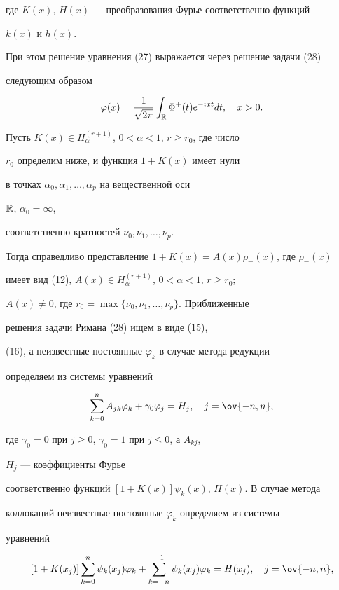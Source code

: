 где $K(x)$, $H(x)$ --- преобразования Фурье соответственно функций 


$k(x)$ и $h(x)$. 


При этом решение уравнения (27) выражается через решение задачи (28) 


следующим образом 


$$ 


\varphi(x)=\frac{1}{\sqrt{2\pi}}\int_{\Bbb R} 


\Phi^+(t)e^{-ixt}dt,\quad x>0. 


$$ 


 


Пусть $K(x)\in H^{(r+1)}_\alpha$, $0<\alpha<1$, $r\ge r_0$, где число 


$r_0$ определим ниже, и функция $1+K(x)$ имеет нули 


в точках $\alpha_0,\alpha_1,\dotsc,\alpha_p$ на вещественной оси 


$\Bbb R$, $\alpha_0=\infty$, 


соответственно кратностей $\nu_0,\nu_1,\dotsc,\nu_p$. 


Тогда справедливо представление $1+K(x)=A(x)\rho_-(x)$, где $\rho_-(x)$ 


имеет вид (12), $A(x)\in H^{(r+1)}_\alpha$, $0<\alpha<1$, $r\ge r_0$; 


$A(x)\ne 0$, где $r_0=\max\{\nu_0,\nu_1,\dotsc,\nu_p\}$. Приближенные 


решения задачи Римана (28) ищем в виде (15), 


(16), а неизвестные постоянные $\varphi_k$ в случае метода редукции 


определяем из системы уравнений 


\begin{equation} 


\sum^n_{k=0}A_{jk}\varphi_k+\gamma_0\varphi_j=H_j,\quad 


j=\ov{-n,n}, 


\end{equation} 


где $\gamma_0=0$ при $j\ge 0$, $\gamma_0=1$ при $j\le 0$, а $A_{kj}$, 


$H_j$ --- коэффициенты Фурье 


соответственно функций $[1+K(x)]\psi_k(x)$, $H(x)$. В случае метода 


коллокаций неизвестные постоянные $\varphi_k$ определяем из системы 


уравнений 


\begin{equation} 


[1+K(x_j)]\sum^n_{k=0}\psi_k(x_j)\varphi_k+ 


\sum^{-1}_{k=-n}\psi_k(x_j)\varphi_k=H(x_j),\quad 


j=\ov{-n,n}, 


\end{equation} 


